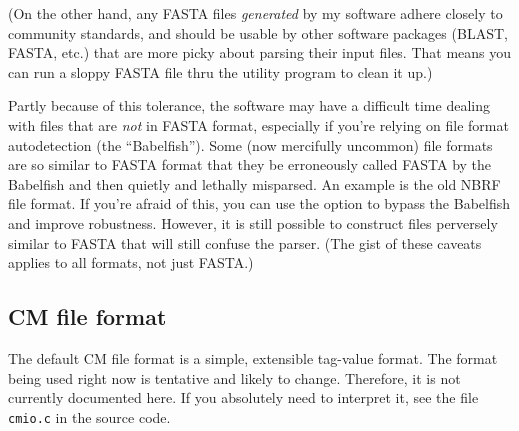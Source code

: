(On the other hand, any FASTA files \emph{generated} by my software
adhere closely to community standards, and should be usable by other
software packages (BLAST, FASTA, etc.) that are more picky about
parsing their input files. That means you can run a sloppy FASTA file
thru the  utility program to clean it up.)

Partly because of this tolerance, the software may have a difficult
time dealing with files that are \textit{not} in FASTA format,
especially if you're relying on file format autodetection (the
``Babelfish'').  Some (now mercifully uncommon) file formats are so
similar to FASTA format that they be erroneously called FASTA by the
Babelfish and then quietly and lethally misparsed. An example is the
old NBRF file format. If you're afraid of this, you can use the
 option to bypass the Babelfish and improve
robustness. However, it is still possible to construct files
perversely similar to FASTA that will still confuse the parser.  (The
gist of these caveats applies to all formats, not just FASTA.)

\subsection{CM file format}

The default CM file format is a simple, extensible tag-value format.
The format being used right now is tentative and likely to
change. Therefore, it is not currently documented here. If you
absolutely need to interpret it, see the file \verb+cmio.c+ in the
source code.


